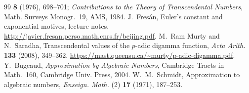 \documentclass[11pt,a4paper]{article}
\theoremstyle{definition}
\theoremstyle{remark}
\numberwithin{equation}{section}
\begin{document}
\begin{thebibliography}{99}
\textbf{8} (1976), 698--701; \emph{Contributions to the Theory of Transcendental Numbers},
Math. Surveys Monogr.~19, AMS, 1984.
 J.~Fres\'an, Euler's constant and exponential motives, lecture notes.
\url{http://javier.fresan.perso.math.cnrs.fr/beijing.pdf}.
 M.~Ram Murty and N.~Saradha, Transcendental values of the $p$-adic
digamma function, \emph{Acta Arith.} \textbf{133} (2008), 349--362.
\url{https://mast.queensu.ca/~murty/p-adic-digamma.pdf}.
 Y.~Bugeaud, \emph{Approximation by Algebraic Numbers}, Cambridge Tracts
in Math.~160, Cambridge Univ. Press, 2004.
 W.~M.~Schmidt, Approximation to algebraic numbers, \emph{Enseign. Math.}
(2) \textbf{17} (1971), 187--253.
\end{thebibliography}
\end{document}
